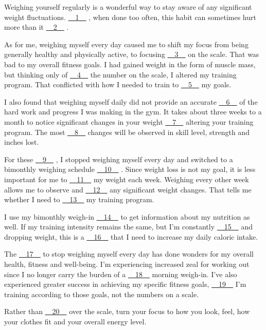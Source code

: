Weighing yourself regularly is a wonderful way to stay aware of any significant weight fluctuations. \uline{~~1~~} , when done too often, this habit can sometimes hurt more than it \uline{~~2~~} .


As for me, weighing myself every day caused me to shift my focus from being generally healthy and physically active, to focusing \uline{~~3~~} on the scale. That was bad to my overall fitness goals. I had gained weight in the form of muscle mass, but thinking only of \uline{~~4~~} the number on the scale, I altered my training program. That conflicted with how I needed to train to \uline{~~5~~} my goals.


I also found that weighing myself daily did not provide an accurate \uline{~~6~~} of the hard work and progress I was making in the gym. It takes about three weeks to a month to notice significant changes in your weight \uline{~~7~~} altering your training program. The most \uline{~~8~~} changes will be observed in skill level, strength and inches lost.


For these \uline{~~9~~} , I stopped weighing myself every day and switched to a bimonthly weighing schedule \uline{~~10~~} . Since weight loss is not my goal, it is less important for me to \uline{~~11~~} my weight each week. Weighing every other week allows me to observe and \uline{~~12~~} any significant weight changes. That tells me whether I need to \uline{~~13~~} my training program.


I use my bimonthly weigh-in \uline{~~14~~} to get information about my nutrition as well. If my training intensity remains the same, but I'm constantly \uline{~~15~~} and dropping weight, this is a \uline{~~16~~} that I need to increase my daily caloric intake.


The \uline{~~17~~} to stop weighing myself every day has done wonders for my overall health, fitness and well-being. I'm experiencing increased zeal for working out since I no longer carry the burden of a \uline{~~18~~} morning weigh-in. I've also experienced greater success in achieving my specific fitness goals, \uline{~~19~~} I'm training according to those goals, not the numbers on a scale.


Rather than \uline{~~20~~} over the scale, turn your focus to how you look, feel, how your clothes fit and your overall energy level.